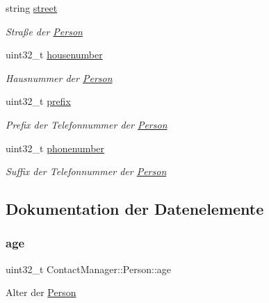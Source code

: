 \begin{DoxyCompactItemize}
string \hyperlink{classContactManager_1_1Person_aa406cf31ed8b781704ea91aa2efded51}{street}
\begin{DoxyCompactList}\small\item\em Straße der \hyperlink{classContactManager_1_1Person}{Person}\end{DoxyCompactList}\item 
uint32\+\_\+t \hyperlink{classContactManager_1_1Person_a8d5ff4192378dbfade263defa5b0198b}{housenumber}
\begin{DoxyCompactList}\small\item\em Hausnummer der \hyperlink{classContactManager_1_1Person}{Person}\end{DoxyCompactList}\item 
uint32\+\_\+t \hyperlink{classContactManager_1_1Person_ac50dc517f5877c3fb05aea6a52cc543d}{prefix}
\begin{DoxyCompactList}\small\item\em Prefix der Telefonnummer der \hyperlink{classContactManager_1_1Person}{Person}\end{DoxyCompactList}\item 
uint32\+\_\+t \hyperlink{classContactManager_1_1Person_afc600ce59bcb61e62e90db8eeaad398b}{phonenumber}
\begin{DoxyCompactList}\small\item\em Suffix der Telefonnummer der \hyperlink{classContactManager_1_1Person}{Person}\end{DoxyCompactList}\end{DoxyCompactItemize}


\subsection{Dokumentation der Datenelemente}
\mbox{\label{classContactManager_1_1Person_a213b6be638a046de34bce8fc8301288c}} 
\subsubsection{\texorpdfstring{age}{age}}
{\footnotesize\ttfamily uint32\+\_\+t Contact\+Manager\+::\+Person\+::age\hspace{0.3cm}{\ttfamily [protected]}}



Alter der \hyperlink{classContactManager_1_1Person}{Person}

